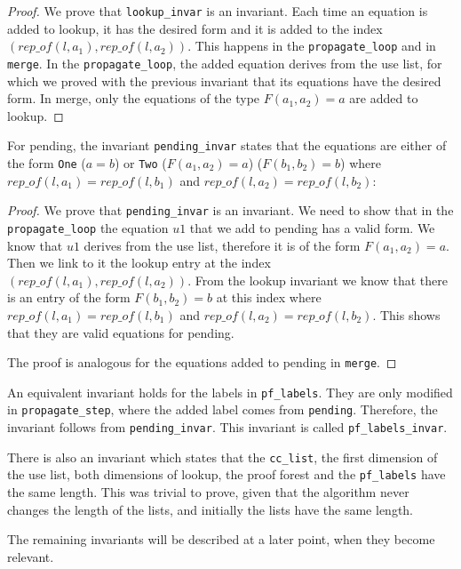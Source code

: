 \begin{proof}
We prove that \lstinline|lookup_invar| is an invariant.
Each time an equation is added to lookup, it has the desired form and it is added to the index $(rep\_of(l, a_1), rep\_of(l, a_2))$. This happens in the \lstinline{propagate_loop} and in \lstinline{merge}. In the \lstinline{propagate_loop}, the added equation derives from the use list, for which we proved with the previous invariant that its equations have the desired form. In merge, only the equations of the type $F(a_1, a_2) = a$ are added to lookup.
\end{proof}

For pending, the invariant \lstinline|pending_invar| states that the equations are either of the form \lstinline{One} ($a = b$) or \lstinline{Two} ($F(a_1, a_2) = a$) ($F(b_1, b_2) = b$) where $rep\_of(l, a_1) = rep\_of(l, b_1)$ and $rep\_of(l, a_2) = rep\_of(l, b_2)$:

\begin{proof}
We prove that \lstinline|pending_invar| is an invariant.
We need to show that in the \lstinline{propagate_loop} the equation $u1$ that we add to pending has a valid form. We know that $u1$ derives from the use list, therefore it is of the form $F(a_1, a_2) = a$. Then we link to it the lookup entry at the index $(rep\_of(l, a_1), rep\_of(l, a_2))$. From the lookup invariant we know that there is an entry of the form $F(b_1, b_2) = b$ at this index where $rep\_of(l, a_1) = rep\_of(l, b_1)$ and $rep\_of(l, a_2) = rep\_of(l, b_2)$. This shows that they are valid equations for pending.

The proof is analogous for the equations added to pending in \lstinline{merge}.
\end{proof}

An equivalent invariant holds for the labels in \lstinline|pf_labels|. They are only modified in \lstinline|propagate_step|, where the added label comes from \lstinline|pending|.
Therefore, the invariant follows from \lstinline|pending_invar|. This invariant is called \lstinline|pf_labels_invar|.

There is also an invariant which states that the \lstinline{cc_list}, the first dimension of the use list, both dimensions of lookup, the proof forest and the \lstinline{pf_labels} have the same length. This was trivial to prove, given that the algorithm never changes the length of the lists, and initially the lists have the same length.

The remaining invariants will be described at a later point, when they become relevant.

